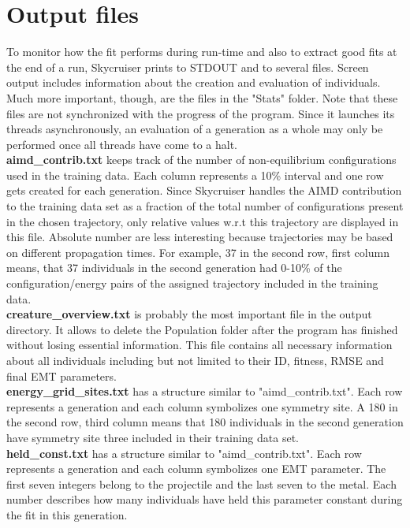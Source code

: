\documentclass[twoside, 11pt, titlepage, captions=nooneline, a4paper, headsepline]{scrbook}%
\newcommand{\9}{\mathrm}
\newcommand{\0}{\,\mathrm}
\begin{document}
\section{Output files}
To monitor how the fit performs during run-time and also to extract good fits at the end of a run, Skycruiser prints to STDOUT and to several files. Screen output includes information about the creation and evaluation of individuals. Much more important, though, are the files in the "Stats" folder. Note that these files are not synchronized with the progress of the program. Since it launches its threads asynchronously, an evaluation of a generation as a whole may only be performed once all threads have come to a halt.\\
\textbf{aimd\_contrib.txt} keeps track of the number of non-equilibrium configurations used in the training data. Each column represents a 10\% interval and one row gets created for each generation. Since Skycruiser handles the AIMD contribution to the training data set as a fraction of the total number of configurations present in the chosen trajectory, only relative values w.r.t this trajectory are displayed in this file. Absolute number are less interesting because trajectories may be based on different propagation times. For example, 37 in the second row, first column means, that 37 individuals in the second generation had 0-10\% of the configuration/energy pairs of the assigned trajectory included in the training data.\\
\textbf{creature\_overview.txt} is probably the most important file in the output directory. It allows to delete the Population folder after the program has finished without losing essential information. This file contains all necessary information about all individuals including but not limited to their ID, fitness, RMSE and final EMT parameters.\\
\textbf{energy\_grid\_sites.txt} has a structure similar to "aimd\_contrib.txt". Each row represents a generation and each column symbolizes one symmetry site. A 180 in the second row, third column means that 180 individuals in the second generation have symmetry site three included in their training data set.\\
\textbf{held\_const.txt} has a structure similar to "aimd\_contrib.txt". Each row represents a generation and each column symbolizes one EMT parameter. The first seven integers belong to the projectile and the last seven to the metal. Each number describes how many individuals have held this parameter constant during the fit in this generation.\\
\end{document}
